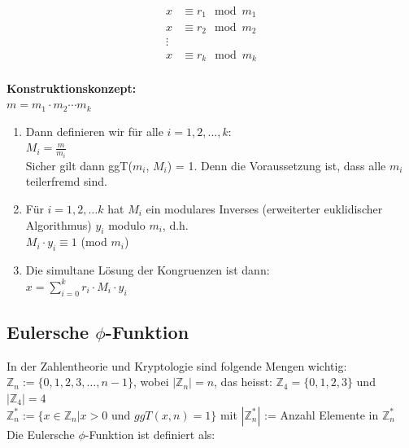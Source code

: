 \documentclass[12pt]{scrartcl}
\begin{document}
\begin{align*}
    x &\equiv r_1 \mod m_1 \\
    x &\equiv r_2 \mod m_2 \\
    \vdots \\
    x &\equiv r_k \mod m_k \\
\end{align*}

\textbf{Konstruktionskonzept:}\\
$m = m_1 \cdot m_2 \cdots m_k$
\begin{enumerate}
    \item Dann definieren wir für alle $i = 1,2, \dots, k$:\\
 
    $\displaystyle{M_i = \frac{m}{m_i}}$\\

    Sicher gilt dann ggT($m_i$, $M_i$) = 1. Denn die Voraussetzung ist, dass alle $m_i$ teilerfremd sind.\\
    \item Für $i = 1,2,\dots k$ hat $M_i$ ein modulares Inverses (erweiterter euklidischer Algorithmus)
    $y_i$ modulo $m_i$, d.h.\\

    $\displaystyle{M_i \cdot y_i \equiv 1}$ (mod $m_i$)\\

    \item Die simultane Lösung der Kongruenzen ist dann:\\
    
    $\displaystyle{x = \sum_{i=0}^{k} r_i \cdot M_i \cdot y_i}$\\

\end{enumerate}


\newpage
\subsection{Eulersche $\phi$-Funktion}
In der Zahlentheorie und Kryptologie sind folgende Mengen wichtig:\\
$\mathbb{Z}_n := \{0,1,2,3, \dots, n-1\}$, wobei $|\mathbb{Z}_n| = n$, das heisst: $\mathbb{Z}_4 = \{0, 1, 2, 3\}$ und $|\mathbb{Z}_4| = 4$\\
$\mathbb{Z}_n^* := \{x \in \mathbb{Z}_n | x > 0 \text{ und } ggT(x,n) = 1\}$ mit $|\mathbb{Z}_n^*|$ := Anzahl Elemente in $\mathbb{Z}_n^*$\\

Die Eulersche $\phi$-Funktion ist definiert als:\\
\end{document}
